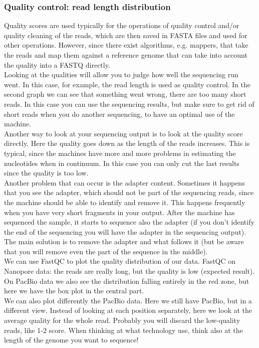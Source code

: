 \begin{description}
\subsubsection{Quality control: read length distribution}
Quality scores are used typically for the operations of quality control and/or quality cleaning of the reads, which are then saved in FASTA files and used for other operations. However, since there exist algorithms, e.g. mappers, that take the reads and map them against a reference genome that can take into account the quality into a FASTQ directly. 
\\
Looking at the qualities will allow you to judge how well the sequencing run went. 
In this case, for example, the read length is used as quality control. In the second graph we can see that something went wrong, there are too many short reads. In this case you can use the sequencing results, but make sure to get rid of short reads when you do another sequencing, to have an optimal use of the machine. 
\\
Another way to look at your sequencing output is to look at the quality score directly. Here the quality goes down as the length of the reads increases. This is typical, since the machines have more and more problems in estimating the nucleotides when in continuum. In this case you can only cut the last results since the quality is too low. 
\\
Another problem that can occur is the adapter content. Sometimes it happens that you see the adapter, which should not be part of the sequencing reads, since the machine should be able to identify and remove it. This happens frequently when you have very short fragments in your output. After the machine has sequenced the sample, it starts to sequence also the adapter (if you don’t identify the end of the sequencing you will have the adapter in the sequencing output). The main solution is to remove the adapter and what follows it (but be aware that you will remove even the part of the sequence in the middle). 
\\
We can use FastQC to plot the quality distribution of our data. FastQC on 
Nanopore data: the reads are really long, but the quality is low (expected result). On PacBio data we also see the distribution falling entirely in the red zone, but here we have the box plot in the central part. 
\\
We can also plot differently the PacBio data. Here we still have PacBio, but in a different view. Instead of looking at each position separately, here we look at the average quality for the whole read. Probably you will discard the low-quality reads, like 1-2 score. When thinking at what technology use, think also at the length of the genome you want to sequence!
 


























\end{description}
